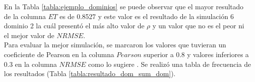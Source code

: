\begin{landscape}
\begin{longtable}{rrrrrrrrrrr}
\end{longtable}


\end{landscape}

En la Tabla \ref{tabla:ejemplo_dominios} se puede observar que el mayor resultado de la columna $ET$ es de 0.8527 y este valor es el resultado de la simulación 6 dominio 2 la cuál presentó el más alto valor de $\rho$ y un valor que no es el peor ni el mejor valor de $NRMSE$.\\

Para evaluar la mejor simulación, se marcaron los valores que tuvieran un coeficiente de Pearson en la columna  $Pearson$ superior a 0.8 y valores inferiores a 0.3 en la columna $NRMSE$ como lo sugiere \citet{Agua2016}. Se realizó una tabla de frecuencia de los resultados (Tabla \ref{tabla:resultado_dom_sum_dom}).\\


%
%         
%



